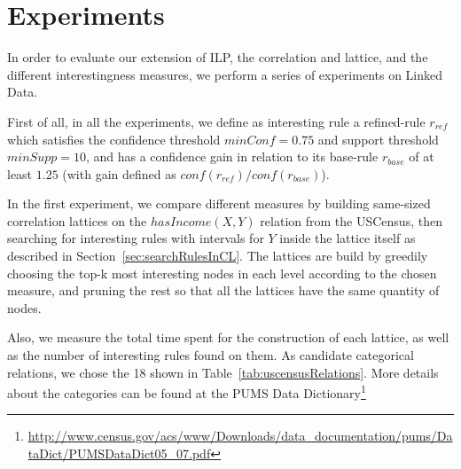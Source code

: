 \chapter{Experiments}
\label{ch:intro}

In order to evaluate our extension of ILP, the correlation and lattice, and the different interestingness measures, we
perform a series of experiments on Linked Data.

First of all, in all the experiments, we define as interesting rule a refined-rule $r_{ref}$ which satisfies the
confidence threshold $minConf=0.75$ and support threshold $minSupp=10$, and has a confidence gain in relation to its
base-rule $r_{base}$ of at least $1.25$ (with gain defined as $conf(r_{ref})/conf(r_{base})$).

In the first experiment, we compare different measures by building same-sized correlation lattices on the
$hasIncome(X,Y)$ relation from the USCensus, then searching for interesting rules with intervals for $Y$ inside the
lattice itself as described in Section~\ref{sec:searchRulesInCL}. The lattices are build by greedily choosing the top-k
most interesting nodes in each level according to the chosen measure, and pruning the rest so that all the lattices have
the same quantity of nodes.

Also, we measure the total time spent for the construction of each lattice, as well as the number of interesting rules
found on them. As candidate categorical relations, we chose the 18 shown in Table~\ref{tab:uscensusRelations}. More
details about the categories can be found at the PUMS
Data
Dictionary\footnote{\url{http://www.census.gov/acs/www/Downloads/data_documentation/pums/DataDict/PUMSDataDict05_07.pdf}
}

